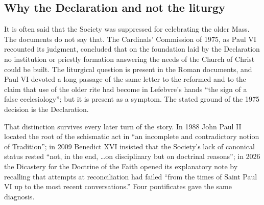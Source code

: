 
\subsection{Why the Declaration and not the liturgy}

It is often said that the Society was suppressed for celebrating the
older Mass. The documents do not say that. The Cardinals' Commission of
1975, as Paul VI recounted its judgment, concluded that on the foundation
laid by the Declaration no institution or priestly formation answering
the needs of the Church of Christ could be built. The liturgical question is present in the Roman documents, and
Paul VI devoted a long passage of the same letter to the reformed
 and to the claim that use of the older rite had become
in Lefebvre's hands ``the sign of a false ecclesiology''; but it is
present as a symptom. The stated ground of the 1975 decision is the
Declaration.

That distinction survives every later turn of the story. In 1988 John
Paul II located the root of the schismatic act in ``an incomplete and
contradictory notion of Tradition''; in 2009 Benedict XVI insisted that
the Society's lack of canonical status rested ``not, in the end, \ldots on
disciplinary but on doctrinal reasons''; in 2026 the Dicastery for the
Doctrine of the Faith opened its explanatory note by recalling that
attempts at reconciliation had failed ``from the times of Saint Paul VI
up to the most recent conversations.'' Four pontificates gave the same
diagnosis.
